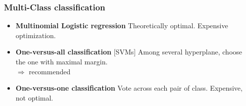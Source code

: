 \begin{frame}
\frametitle{Multi-Class classification}
\begin{itemize}
\item {\bf Multinomial Logistic regression} Theoretically optimal. Expensive optimization. 
\item {\bf One-versus-all classification} [SVMs] Among several
  hyperplane, choose the one with maximal margin. \\$\Longrightarrow$
  recommended
\item {\bf One-versus-one classification} Vote across each pair of
  class. Expensive, not optimal.
\end{itemize}
\end{frame}

